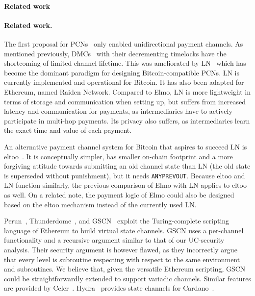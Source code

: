 \makeatletter%
%
  {\paragraph{Related work}}%
  {\paragraph{Related work.}}%
\makeatother%
 The first proposal for PCNs~\cite{spilman} only enabled
 unidirectional payment channels. As mentioned previously, DMCs~\cite{decker}
 with their decrementing timelocks have the shortcoming of limited channel
 lifetime. This was ameliorated by LN~\cite{lightning} which has become the dominant paradigm for designing Bitcoin-compatible PCNs.
 LN is currently implemented and operational for
  Bitcoin. It has also been adapted for Ethereum, named
  Raiden Network. Compared to Elmo, LN is more lightweight in terms of
  storage and communication when setting up, but suffers from increased latency
  and communication for payments, as intermediaries have to actively participate
  in multi-hop payments. Its privacy also suffers, as intermediaries
  learn the exact time and value of each payment.

  An alternative payment channel system for Bitcoin that aspires to
  succeed LN is eltoo~\cite{eltoo}. It is conceptually simpler,
  has smaller on-chain footprint and a more forgiving attitude towards
  submitting an old channel state than LN (the old state is superseded without punishment), but it needs
  \texttt{ANYPREVOUT}. Because eltoo and LN function similarly, the previous comparison of
  Elmo with LN applies to eltoo as well. On a related note, the payment
  logic of Elmo could also be designed based on the eltoo mechanism instead of
  the currently used LN.

Perun~\cite{perun},
Thunderdome~\cite{avarikioti2025thunderdometimelockfreerationallysecurevirtual},
and GSCN~\cite{DBLP:conf/ccs/DziembowskiFH18} exploit the
  Turing-complete scripting language of Ethereum to build virtual state
  channels.
  GSCN uses a per-channel functionality and a recursive argument similar
  to that of our UC-security analysis. Their security argument is however
  flawed, as they incorrectly argue that every level is subroutine respecting
  with respect to the same environment and subroutines.
  We believe that, given the versatile Ethereum scripting, GSCN could be
  straightforwardly extended to support variadic channels.
  Similar features are provided by Celer~\cite{dong2018celer}.
  Hydra~\cite{cryptoeprint:2020:299} provides state channels for
  Cardano~\cite{cardano}.

